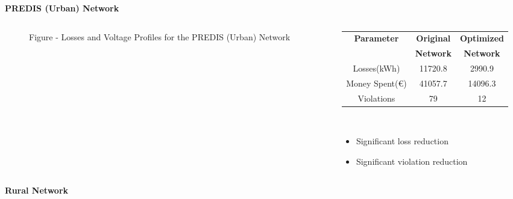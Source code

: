 \documentclass[final]{beamer}
\begin{document}
\begin{frame}[t]
{\normalsize \textbf{PREDIS (Urban) Network}}

\begin{columns}
\begin{column}{0.8\linewidth}
\begin{figure}[!h]
\begin{minipage}[H]{.33\columnwidth}
	\newlength\figureheight
	\newlength\figurewidth
    \setlength\figureheight{4.5cm}
    \setlength\figurewidth{5.5cm}
	
\end{minipage}%
\begin{minipage}[H]{.33\columnwidth}
	\vspace*{-0.3cm}
	\setlength\figureheight{4.5cm}
    \setlength\figurewidth{5.5cm}
	
\end{minipage}%
\begin{minipage}[H]{.33\columnwidth}
	\vspace*{-0.3cm}
	\setlength\figureheight{4.5cm}
    \setlength\figurewidth{5.5cm}
	
\end{minipage}%
\caption*{Figure - Losses and Voltage Profiles for the PREDIS (Urban) Network}
\label{fig:mandb}
\end{figure}
\end{column}
\begin{column}{0.25\linewidth}
\vspace*{-2.5cm}
\justifying
 \begin{table}[!hl]
\begin{tabular}{ccc}
\textbf{Parameter} & \textbf{Original} & \textbf{Optimized}\\
& \textbf{Network} & \textbf{Network}\\
\hline
Losses(kWh) & 11720.8 & 2990.9\\
Money Spent(\euro) & 41057.7 & 14096.3 \\
Violations & 79 & 12\\
\hline
\end{tabular}
\end{table}
\ \\
\begin{itemize}
\item Significant loss reduction
\item Significant violation reduction
\end{itemize}
\end{column}
\end{columns}
\vspace*{0.5cm}
{\normalsize \textbf{Rural Network}}


\end{frame}
\end{document}
